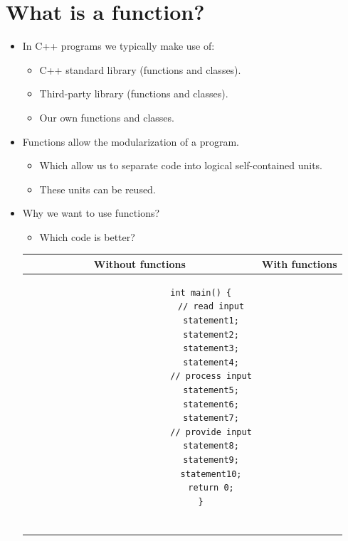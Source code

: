 \section{What is a function?}
\begin{itemize}
    \item In C++ programs we typically make use of:
        \begin{itemize}
            \item C++ standard library (functions and classes).
            \item Third-party library (functions and classes).
            \item Our own functions and classes.
        \end{itemize}
    
    \item Functions allow the modularization of a program.
        \begin{itemize}
            \item Which allow us to separate code into logical self-contained units.
            \item These units can be reused.
        \end{itemize}
    
    \item Why we want to use functions?
        \begin{itemize}
            \item Which code is better?
        \end{itemize}
        \begin{center}
            \begin{tabular}{ |c|c| }
                \hline
                    Without functions & With functions \\
                \hline
                    \begin{verbatim}
                        int main() {
                            // read input
                            statement1;
                            statement2;
                            statement3;
                            statement4;
                            // process input
                            statement5;
                            statement6;
                            statement7;
                            // provide input
                            statement8;
                            statement9;
                            statement10;
                            return 0;
                        }


\end{verbatim}
\end{tabular}
\end{center}
\end{itemize}
